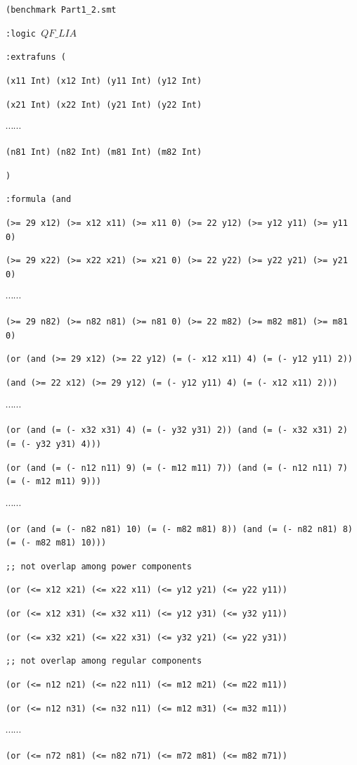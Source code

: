 {\footnotesize

{\tt (benchmark Part1\_2.smt}

{\tt :logic $QF\_LIA$}

{\tt :extrafuns (}

{\tt (x11 Int) (x12 Int) (y11 Int) (y12 Int)}

{\tt (x21 Int) (x22 Int) (y21 Int) (y22 Int)}

$\cdots \cdots$

{\tt (n81 Int) (n82 Int) (m81 Int) (m82 Int)}

{\tt )}

{\tt :formula (and}

{\tt (>= 29 x12) (>= x12 x11) (>= x11 0) (>= 22 y12) (>= y12 y11) (>= y11 0)}

{\tt (>= 29 x22) (>= x22 x21) (>= x21 0) (>= 22 y22) (>= y22 y21) (>= y21 0)}

$\cdots \cdots$

{\tt (>= 29 n82) (>= n82 n81) (>= n81 0) (>= 22 m82) (>= m82 m81) (>= m81 0)}

{\tt (or (and (>= 29 x12) (>= 22 y12) (= (- x12 x11) 4) (= (- y12 y11) 2))}

{\tt (and (>= 22 x12) (>= 29 y12) (= (- y12 y11) 4) (= (- x12 x11) 2)))}

$\cdots \cdots$

{\tt (or (and (= (- x32 x31) 4) (= (- y32 y31) 2)) (and (= (- x32 x31) 2) (= (- y32 y31) 4)))}

{\tt (or (and (= (- n12 n11) 9) (= (- m12 m11) 7)) (and (= (- n12 n11) 7) (= (- m12 m11) 9)))}

$\cdots \cdots$

{\tt (or (and (= (- n82 n81) 10) (= (- m82 m81) 8)) (and (= (- n82 n81) 8) (= (- m82 m81) 10)))}

{\tt ;; not overlap among power components}

{\tt (or (<= x12 x21) (<= x22 x11) (<= y12 y21) (<= y22 y11))}

{\tt (or (<= x12 x31) (<= x32 x11) (<= y12 y31) (<= y32 y11))}

{\tt (or (<= x32 x21) (<= x22 x31) (<= y32 y21) (<= y22 y31))}

{\tt ;; not overlap among regular components}

{\tt (or (<= n12 n21) (<= n22 n11) (<= m12 m21) (<= m22 m11))}

{\tt (or (<= n12 n31) (<= n32 n11) (<= m12 m31) (<= m32 m11))}

$\cdots \cdots$

{\tt (or (<= n72 n81) (<= n82 n71) (<= m72 m81) (<= m82 m71))}

}
